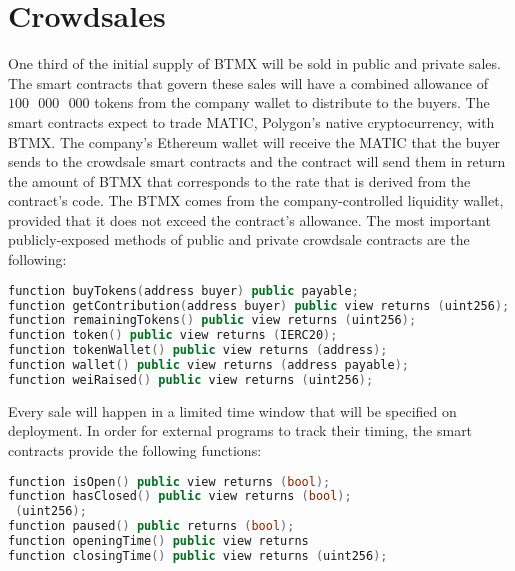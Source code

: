 \documentclass[a4paper,12pt]{article}
\begin{document}
\section{Crowdsales}

One third of the initial supply of BTMX will be sold in public and private sales. The smart contracts that govern these sales will have a combined allowance
of $100\text{ }000\text{ }000$ tokens from the company wallet to distribute to the buyers.
The smart contracts expect to trade MATIC,
Polygon's native cryptocurrency, with BTMX.
The company's Ethereum wallet will receive the MATIC that the buyer sends to the crowdsale
smart contracts and the contract will send them in return the amount of BTMX that
corresponds to the rate that is derived from the contract's code. The BTMX comes from the company-controlled liquidity wallet,
provided that it does not exceed the contract's allowance. The most important publicly-exposed methods of public and private crowdsale contracts are the following:
\begin{lstlisting}[language=C++, caption=Solidity common crowdsale function signatures]
function buyTokens(address buyer) public payable;
function getContribution(address buyer) public view returns (uint256);
function remainingTokens() public view returns (uint256);
function token() public view returns (IERC20);
function tokenWallet() public view returns (address);
function wallet() public view returns (address payable);
function weiRaised() public view returns (uint256);
\end{lstlisting}

Every sale will happen in a limited time window that will be specified on deployment.
In order for external programs to track their timing, the smart contracts provide the following functions:
\begin{lstlisting}[language=C++, caption=Solidity crowdsale timing function signatures]
function isOpen() public view returns (bool);
function hasClosed() public view returns (bool);
 (uint256);
function paused() public returns (bool);
function openingTime() public view returns
function closingTime() public view returns (uint256);
\end{lstlisting}
\end{document}
